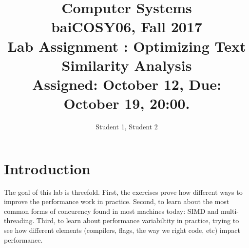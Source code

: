 \documentclass[11pt]{article}
\begin{document}
\title{Computer Systems\\
baiCOSY06, Fall 2017\\
Lab Assignment : Optimizing Text Similarity Analysis \\
Assigned: October 12, Due: October 19, 20:00. 
}

\author{Student 1, Student 2}
\date{}

\maketitle



\section{Introduction}
The goal of this lab is threefold. First, the exercises prove how different ways to improve the performance work in practice. 
Second, to learn about the most common forms of concurency found in most machines today: SIMD and multi-threading. 
Third, to learn about performance variabiltity in practice, trying to see how different elements (compilers, flags, the way we right code, etc) impact performance. 
\end{document}
